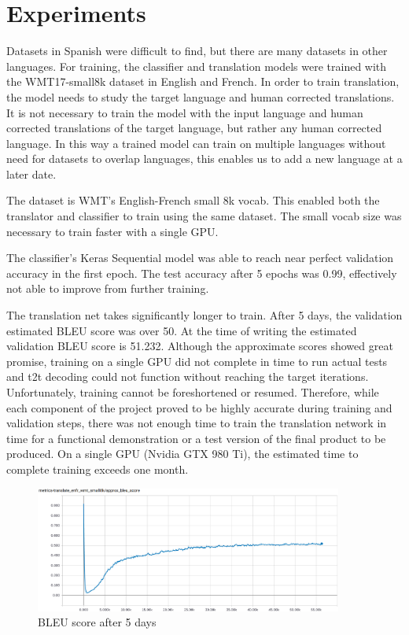 \documentclass[10pt,a4paper]{article}
\begin{document}
\clearpage


\section{Experiments}


Datasets in Spanish were difficult to find, but there are many datasets in other languages. For training, the classifier and translation models were trained with the WMT17-small8k dataset in English and French. In order to train translation, the model needs to study the target language and human corrected translations. It is not necessary to train the model with the input language and human corrected translations of the target language, but rather any human corrected language. In this way a trained model can train on multiple languages without need for datasets to overlap languages, this enables us to add a new language at a later date.


The dataset is WMT's English-French small 8k vocab. This enabled both the translator and classifier to train using the same dataset. The small vocab size was necessary to train faster with a single GPU.


The classifier's Keras Sequential model was able to reach near perfect validation accuracy in the first epoch. The test accuracy after 5 epochs was 0.99, effectively not able to improve from further training.
  
The translation net takes significantly longer to train. After 5 days, the validation estimated BLEU score was over 50. At the time of writing the estimated validation BLEU score is 51.232. Although the approximate scores showed great promise, training on a single GPU did not complete in time to run actual tests and t2t decoding could not function without reaching the target iterations. Unfortunately, training cannot be foreshortened or resumed. Therefore, while each component of the project proved to be highly accurate during training and validation steps, there was not enough time to train the translation network in time for a functional demonstration or a test version of the final product to be produced. On a single GPU (Nvidia GTX 980 Ti), the estimated time to complete training exceeds one month.


\begin{figure}[H]
  \begin{center}
    \includegraphics[width=0.9\textwidth] {BLEU.png}
    \caption{BLEU score after 5 days}
  \end{center}
\end{figure}
\end{document}
